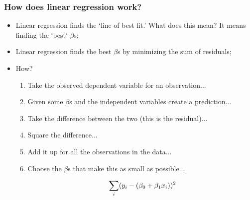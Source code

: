 \documentclass[aspectratio=169]{beamer}
\theoremstyle{principle}
\begin{document}
\begin{frame}
\frametitle{How does linear regression work?}

\begin{itemize}
\item Linear regression finds the `line of best fit.'  What does this mean?  It means finding the `best' $\beta$s;
\bigskip

\item Linear regression finds the best $\beta$s by minimizing the sum of residuals;
\bigskip

\item How?
\begin{enumerate}
\item Take the observed dependent variable for an observation...
\item Given some $\beta$s and the independent variables create a prediction...
\item Take the difference between the two (this is the residual)...
\item Square the difference...
\item Add it up for all the observations in the data...
\item[]\color{white} Choose the $\beta$s that make this as small as possible...
\end{enumerate}
\begin{align*}
\color{white}\min_{\beta_0,\beta_1}\color{black}\sum_i(y_i - (\beta_0 + \beta_1 x_i))^2
\end{align*}
\end{itemize}

\end{frame}
\end{document}
